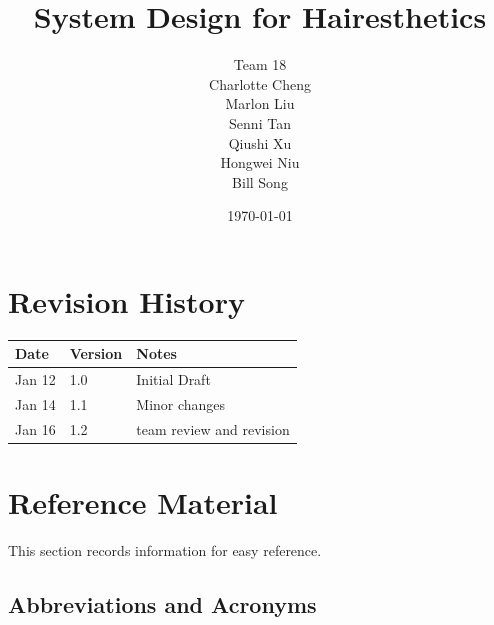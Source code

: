 \documentclass[12pt, titlepage]{article}
\begin{document}
\title{System Design for Hairesthetics}

\author{Team 18 \\ Charlotte Cheng
        \\ Marlon Liu
        \\ Senni Tan
        \\ Qiushi Xu
        \\ Hongwei Niu
        \\ Bill Song
}

\date{\today}

\maketitle


\section{Revision History}

\begin{tabularx}{\textwidth}{p{3cm}p{2cm}X}
\toprule {\bf Date} & {\bf Version} & {\bf Notes}\\
\midrule
Jan 12 & 1.0 & Initial Draft\\
Jan 14 & 1.1 & Minor changes\\
Jan 16 & 1.2 & team review and revision \\
\bottomrule
\end{tabularx}

\newpage

\section{Reference Material}

This section records information for easy reference.

\subsection{Abbreviations and Acronyms}
\end{document}

